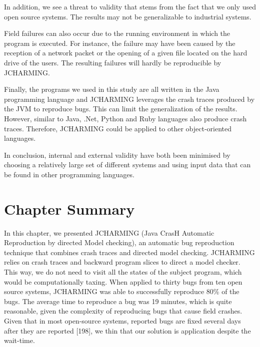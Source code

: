 \documentclass[12pt]{report}
\begin{document}
In addition, we see a threat to validity that stems from the fact that
we only used open source systems. The results may not be generalizable
to industrial systems.

Field failures can also occur due to the running environment in which
the program is executed. For instance, the failure may have been caused
by the reception of a network packet or the opening of a given file
located on the hard drive of the users. The resulting failures will
hardly be reproducible by JCHARMING.

Finally, the programs we used in this study are all written in the Java
programming language and JCHARMING leverages the crash traces produced
by the JVM to reproduce bugs. This can limit the generalization of the
results. However, similar to Java, .Net, Python and Ruby languages also
produce crash traces. Therefore, JCHARMING could be applied to other
object-oriented languages.

In conclusion, internal and external validity have both been minimised
by choosing a relatively large set of different systems and using input
data that can be found in other programming languages.

\section{\texorpdfstring{Chapter
Summary\label{sec:conclusion}}{Chapter Summary}}\label{chapter-summary-4}

In this chapter, we presented JCHARMING (Java CrasH Automatic
Reproduction by directed Model checking), an automatic bug reproduction
technique that combines crash traces and directed model checking.
JCHARMING relies on crash traces and backward program slices to direct a
model checker. This way, we do not need to visit all the states of the
subject program, which would be computationally taxing. When applied to
thirty bugs from ten open source systems, JCHARMING was able to
successfully reproduce 80\% of the bugs. The average time to reproduce a
bug was 19 minutes, which is quite reasonable, given the complexity of
reproducing bugs that cause field crashes. Given that in most
open-source systems, reported bugs are fixed several days after they are
reported {[}198{]}, we thin that our solution is application despite the
wait-time.
\end{document}
